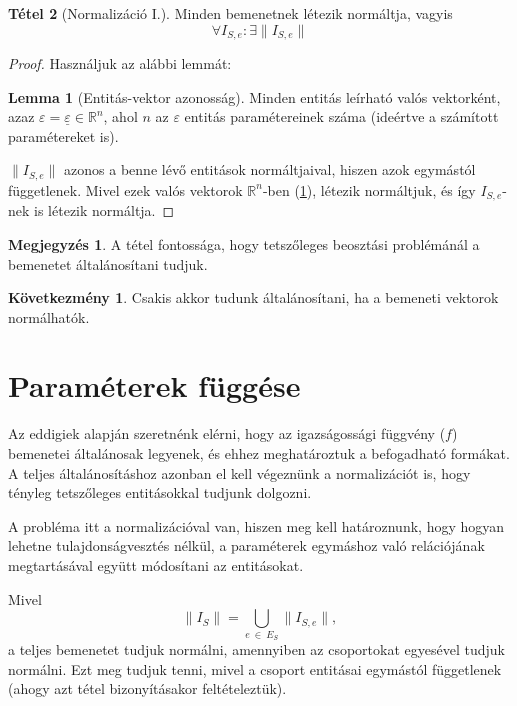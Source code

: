 \documentclass[twocolumn]{article}
\theoremstyle{definition}
\newtheorem{theorem}{Tétel}[section]
\newtheorem*{kov}{Következmény}
\newtheorem*{megj}{Megjegyzés}
\newtheorem{lemma}[theorem]{Lemma}
\newcommand{\vect}[1]{ \underline{#1} }
\newcommand{\norm}[1]{ \parallel {#1} \parallel }
\begin{document}
    \begin{theorem}[Normalizáció I.] \label{thm:norm1}
        Minden bemenetnek létezik normáltja, vagyis
        \begin{equation}
            \forall I_{S,e} : \exists \norm{I_{S,e}} 
        \end{equation}
        \begin{proof}
        Használjuk az alábbi lemmát:
            \begin{lemma}[Entitás-vektor azonosság] \label{lem:vektor}
                Minden entitás leírható valós vektorként, azaz 
                $\varepsilon = \vect{\varepsilon} \in \mathbb{R}^n$, 
                ahol $n$ az $\varepsilon$ entitás paramétereinek száma (ideértve a számított paramétereket is).
            \end{lemma}
            $\parallel I_{S,e}\parallel $ azonos a benne lévő entitások normáltjaival, hiszen azok egymástól függetlenek. Mivel ezek valós vektorok $\mathbb{R}^n$-ben (\ref{lem:vektor}), létezik normáltjuk, és így $I_{S,e}$-nek is létezik normáltja.
        \end{proof}
        \begin{megj}
            A tétel fontossága, hogy tetszőleges beosztási problémánál a bemenetet általánosítani tudjuk.
        \end{megj}
        \begin{kov}
            Csakis akkor tudunk általánosítani, ha a bemeneti vektorok normálhatók.
        \end{kov}
    \end{theorem}
    
\section{Paraméterek függése}

    Az eddigiek alapján szeretnénk elérni, hogy az igazságossági függvény ($f$) bemenetei általánosak legyenek, és ehhez meghatároztuk a befogadható formákat. A teljes általánosításhoz azonban el kell végeznünk a normalizációt is, hogy tényleg tetszőleges entitásokkal tudjunk dolgozni. 
    
    A probléma itt a normalizációval van, hiszen meg kell határoznunk, hogy hogyan lehetne tulajdonságvesztés nélkül, a paraméterek egymáshoz való relációjának megtartásával együtt módosítani az entitásokat.
    
    Mivel 
    \begin{equation}
        \norm{I_S}  = \bigcup_{e\ \in \ E_S} \norm{I_{S,e}} ,
    \end{equation}
    a teljes bemenetet tudjuk normálni, amennyiben az csoportokat egyesével tudjuk normálni. Ezt meg tudjuk tenni, mivel a csoport entitásai egymástól függetlenek (ahogy azt \az{(\ref{thm:norm1})} tétel bizonyításakor feltételeztük).
    
\end{document}
